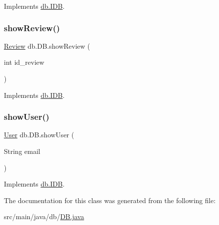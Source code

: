 Implements \hyperlink{interfacedb_1_1_i_d_b_a6418edaf7c25f99f0422c0000db521fa}{db.\+I\+DB}.

\mbox{\label{classdb_1_1_d_b_a84b36a9e2c155b1aa2868844cd157df7}} 
\subsubsection{\texorpdfstring{show\+Review()}{showReview()}}
{\footnotesize\ttfamily \hyperlink{classserver_1_1data_1_1_review}{Review} db.\+D\+B.\+show\+Review (\begin{DoxyParamCaption}\item[{int}]{id\+\_\+review }\end{DoxyParamCaption})}



Implements \hyperlink{interfacedb_1_1_i_d_b_a6c44c3135f07ec6dbef84ecc6fe4f90f}{db.\+I\+DB}.

\mbox{\label{classdb_1_1_d_b_a914986669ac622ef33ae344baaefa32c}} 
\subsubsection{\texorpdfstring{show\+User()}{showUser()}}
{\footnotesize\ttfamily \hyperlink{classserver_1_1data_1_1_user}{User} db.\+D\+B.\+show\+User (\begin{DoxyParamCaption}\item[{String}]{email }\end{DoxyParamCaption})}



Implements \hyperlink{interfacedb_1_1_i_d_b_a8dca82226b1c27ceb4b765259546513d}{db.\+I\+DB}.



The documentation for this class was generated from the following file\+:\begin{DoxyCompactItemize}
\item 
src/main/java/db/\hyperlink{_d_b_8java}{D\+B.\+java}\end{DoxyCompactItemize}
